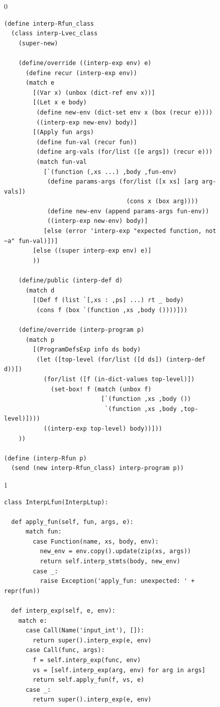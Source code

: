 \documentclass[7x10,nocrop]{TimesAPriori_MIT}%
\def\racketEd{0}
\def\pythonEd{1}
\def\edition{1}
\begin{document}
\begin{figure}[tp]
{\if\edition\racketEd  
\begin{lstlisting}
(define interp-Rfun_class
  (class interp-Lvec_class
    (super-new)

    (define/override ((interp-exp env) e)
      (define recur (interp-exp env))
      (match e
        [(Var x) (unbox (dict-ref env x))]
        [(Let x e body)
         (define new-env (dict-set env x (box (recur e))))
         ((interp-exp new-env) body)]
        [(Apply fun args)
         (define fun-val (recur fun))
         (define arg-vals (for/list ([e args]) (recur e)))
         (match fun-val
           [`(function (,xs ...) ,body ,fun-env)
            (define params-args (for/list ([x xs] [arg arg-vals])
                                  (cons x (box arg))))
            (define new-env (append params-args fun-env))
            ((interp-exp new-env) body)]
           [else (error 'interp-exp "expected function, not ~a" fun-val)])]
        [else ((super interp-exp env) e)]
        ))

    (define/public (interp-def d)
      (match d
        [(Def f (list `[,xs : ,ps] ...) rt _ body)
         (cons f (box `(function ,xs ,body ())))]))

    (define/override (interp-program p)
      (match p
        [(ProgramDefsExp info ds body)
         (let ([top-level (for/list ([d ds]) (interp-def d))])
           (for/list ([f (in-dict-values top-level)])
             (set-box! f (match (unbox f)
                           [`(function ,xs ,body ())
                            `(function ,xs ,body ,top-level)])))
           ((interp-exp top-level) body))]))
    ))

(define (interp-Rfun p)
  (send (new interp-Rfun_class) interp-program p))
\end{lstlisting}
\fi}
{\if\edition\pythonEd
\begin{lstlisting}
class InterpLfun(InterpLtup):
  
  def apply_fun(self, fun, args, e):
      match fun:
        case Function(name, xs, body, env):
          new_env = env.copy().update(zip(xs, args))
          return self.interp_stmts(body, new_env)
        case _:
          raise Exception('apply_fun: unexpected: ' + repr(fun))
    
  def interp_exp(self, e, env):
    match e:
      case Call(Name('input_int'), []):
        return super().interp_exp(e, env)      
      case Call(func, args):
        f = self.interp_exp(func, env)
        vs = [self.interp_exp(arg, env) for arg in args]
        return self.apply_fun(f, vs, e)
      case _:
        return super().interp_exp(e, env)


\end{lstlisting}}
\end{figure}
\end{document}
